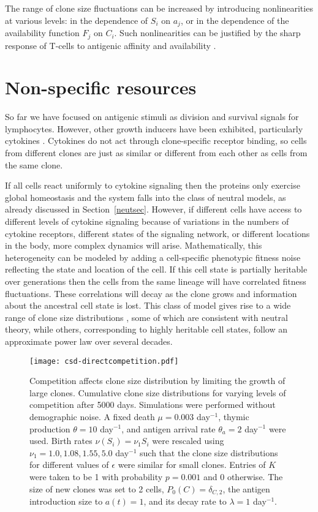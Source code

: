 \documentclass[aps,pre,twocolumn,superscriptaddress,groupedaddress]{revtex4}
\newcommand{\<}{\langle}
\renewcommand{\>}{\rangle}
\begin{document}
The range of clone size fluctuations can be increased by introducing nonlinearities at various levels: in the dependence of $S_i$ on $a_j$, or in the dependence of the availability function $F_j$ on $C_i$. Such nonlinearities can be justified by the sharp response of T-cells to antigenic affinity and availability \cite{Voisinne2015,Lever2016}. 
 
 \section{Non-specific resources}
 \label{nonspec}
 
So far we have focused on antigenic stimuli as division and survival signals for lymphocytes. However, other growth inducers have been exhibited, particularly cytokines \cite{Schluns2000,Tan2001}. Cytokines do not act through clone-specific receptor binding, so cells from different clones are just as similar or different from each other as cells from the same clone. 
 
If all cells react uniformly to cytokine signaling then the proteins only exercise global homeostasis and the system falls into the class of neutral models, as already discussed in Section~\ref{neutsec}. However, if different cells have access to different levels of cytokine signaling because of variations in the numbers of cytokine receptors, different states of the signaling network, or different locations in the body, more complex dynamics will arise. Mathematically, this heterogeneity can be modeled by adding a cell-specific phenotypic fitness noise reflecting the state and location of the cell.
If this cell state is partially heritable over generations then the cells from the same lineage will have correlated fitness fluctuations. These correlations will decay as the clone grows and information about the ancestral cell state is lost. This class of model gives rise to a wide range of clone size distributions \cite{desponds2016}, some of which are consistent with neutral theory, while others, corresponding to highly heritable cell states, follow an approximate power law over several decades. 

\begin{figure}
\begin{center}
\texttt{[image: csd-directcompetition.pdf]}
\caption{Competition affects clone size distribution by limiting the growth of large clones. Cumulative clone size distributions for varying levels of competition after 5000 days. Simulations were performed without demographic noise. A fixed death $\mu=0.003$ day${}^{-1}$, thymic production $\theta = 10$ day${}^{-1}$, and antigen arrival rate $\theta_a = 2$  day${}^{-1}$ were used. Birth rates $\nu(S_i) = \nu_1 S_i$ were rescaled using $\nu_1 = 1.0, 1.08, 1.55, 5.0$ day${}^{-1}$ such that the clone size distributions for different values of $\epsilon$ were similar for small clones. Entries of $K$ were taken to be 1 with probability $p=0.001$ and $0$ otherwise. The size of new clones was set to 2 cells, $P_0(C)=\delta_{C,2}$, the antigen introduction size to $a(t)=1$, and its decay rate to $\lambda = 1$ day${}^{-1}$.}
\label{andreas}
\end{center}
\end{figure}  
  
\end{document}
